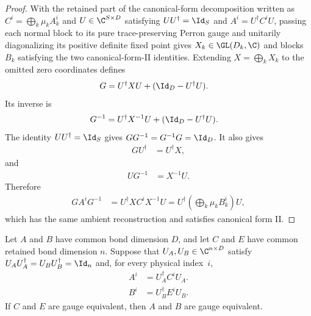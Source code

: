 \begin{proof}
    \leanok
    With the retained part of the canonical-form decomposition written as
    $C^i=\bigoplus_k\mu_kA_k^i$ and
    $U\in\C^{S\times D}$ satisfying $UU^\dagger=\Id_S$ and
    $A^i=U^\dagger C^iU$, passing each normal block to its pure
    trace-preserving Perron gauge and unitarily diagonalizing its positive definite
    fixed point gives $X_k\in\GL(D_k,\C)$ and blocks
    $B_k$ satisfying the two canonical-form-II identities. Extending
    $X=\bigoplus_kX_k$ to the omitted zero coordinates defines
    \begin{align}
        G
         & =U^\dagger XU+(\Id_D-U^\dagger U).
    \end{align}
    Its inverse is
    \begin{align}
        G^{-1}
         & =U^\dagger X^{-1}U+(\Id_D-U^\dagger U).
    \end{align}
    The identity $UU^\dagger=\Id_S$ gives $GG^{-1}=G^{-1}G=\Id_D$. It also gives
    \begin{align}
        GU^\dagger
         & =U^\dagger X,
    \end{align}
    and
    \begin{align}
        UG^{-1}
         & =X^{-1}U.
    \end{align}
    Therefore
    \begin{align}
        GA^iG^{-1}
         & =U^\dagger X C^iX^{-1}U
        =U^\dagger\!\left(\bigoplus_k\mu_kB_k^i\right)U,
    \end{align}
    which has the same ambient reconstruction and satisfies canonical form II.
\end{proof}

\begin{lemma}
    \label{thm:coisometry_reconstruction_gauge_equiv}
    \leanok
    Let $A$ and $B$ have common bond dimension $D$, and let $C$ and $E$
    have common retained bond dimension $n$. Suppose that
    $U_A,U_B\in\C^{n\times D}$ satisfy
    $U_AU_A^\dagger=U_BU_B^\dagger=\Id_n$ and, for every physical index~$i$,
    \begin{align}
        A^i
         & =U_A^\dagger C^iU_A.
    \end{align}
    \begin{align}
        B^i
         & =U_B^\dagger E^iU_B.
    \end{align}
    If $C$ and $E$ are gauge equivalent, then $A$ and $B$ are gauge equivalent.
\end{lemma}

